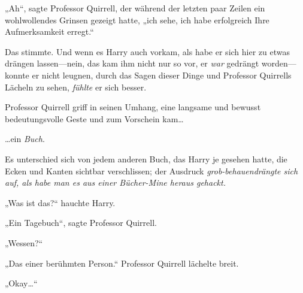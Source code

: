 „Ah“, sagte Professor Quirrell, der während der letzten paar Zeilen ein wohlwollendes Grinsen gezeigt hatte, „ich sehe, ich habe erfolgreich Ihre Aufmerksamkeit erregt.“

Das stimmte. Und wenn es Harry auch vorkam, als habe er sich hier zu etwas drängen lassen—nein, das kam ihm nicht nur so vor, er \emph{war} gedrängt worden—konnte er nicht leugnen, durch das Sagen dieser Dinge und Professor Quirrells Lächeln zu sehen, \emph{fühlte} er sich besser.

Professor Quirrell griff in seinen Umhang, eine langsame und bewusst bedeutungsvolle Geste und zum Vorschein kam…

…ein \emph{Buch}.

Es unterschied sich von jedem anderen Buch, das Harry je gesehen hatte, die Ecken und Kanten sichtbar verschlissen; der Ausdruck \emph{grob-behauendrängte sich auf, als habe man es aus einer Bücher-Mine heraus gehackt.}

„Was ist das?“ hauchte Harry.

„Ein Tagebuch“, sagte Professor Quirrell.

„Wessen?“

„Das einer berühmten Person.“ Professor Quirrell lächelte breit.

„Okay…“

